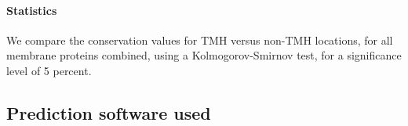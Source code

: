 
\paragraph{Statistics}

We compare the conservation values for TMH versus non-TMH locations,
for all membrane proteins combined,
using a Kolmogorov-Smirnov test, for a significance level of 5 percent.

\subsection{Prediction software used}
\label{subsec:prediction_software_used}

